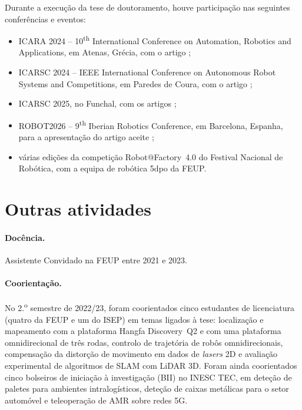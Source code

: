 \documentclass[11pt,a4paper,oneside]{article}
\begin{document}
Durante a execução da tese de doutoramento, houve participação nas seguintes
conferências e eventos:
\begin{itemize}
\item ICARA 2024 -- 10\textsuperscript{th} International Conference on
      Automation, Robotics and Applications, em Atenas, Grécia, com o artigo
      \cite{sousa:icara:2024};
\item ICARSC 2024 -- IEEE International Conference on Autonomous Robot Systems
      and Competitions, em Paredes de Coura, com o artigo
      \cite{sousa:icarsc:2024};
\item ICARSC 2025, no Funchal, com os artigos
      \cite{sousa:icarsc:2025,pacheco:icarsc:2025,lopes:icarsc:2025};
\item ROBOT2026 -- 9\textsuperscript{th} Iberian Robotics Conference, em
      Barcelona, Espanha, para a apresentação do artigo aceite
      \cite{sousa:robot:2026};
\item várias edições da competição Robot@Factory~4.0 do Festival Nacional de
      Robótica, com a equipa de robótica 5dpo da FEUP.
\end{itemize}

\section{Outras atividades}\label{sec:outras}

\paragraph{Docência.} Assistente Convidado na FEUP entre 2021 e 2023.

\paragraph{Coorientação.} No 2.\textsuperscript{o} semestre de 2022/23, foram
coorientados cinco estudantes de licenciatura (quatro da FEUP e um do ISEP) em
temas ligados à tese: localização e mapeamento com a plataforma Hangfa
Discovery~Q2 e com uma plataforma omnidirecional de três rodas, controlo de
trajetória de robôs omnidirecionais, compensação da distorção de movimento em
dados de \textit{lasers} 2D e avaliação experimental de algoritmos de SLAM com
LiDAR 3D. Foram ainda coorientados cinco bolseiros de iniciação à investigação
(BII) no INESC TEC, em deteção de paletes para ambientes intralogísticos, deteção
de caixas metálicas para o setor automóvel e teleoperação de AMR sobre redes 5G.
\end{document}
